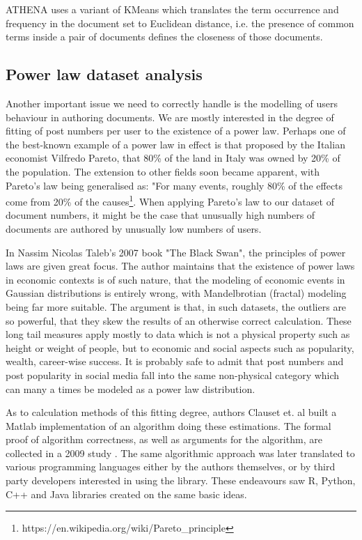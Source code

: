 ATHENA uses a variant of KMeans which translates the term occurrence and frequency in the document set to Euclidean distance, i.e. the presence of common terms inside a pair of documents defines the closeness of those documents.

\subsection{Power law dataset analysis}
Another important issue we need to correctly handle is the modelling of users behaviour in authoring documents. We are mostly interested in the degree of fitting of post numbers per user to the existence of a power law. Perhaps one of the best-known example of a power law in effect is that proposed by the Italian economist Vilfredo Pareto, that 80\% of the land in Italy was owned by 20\% of the population. The extension to other fields soon became apparent, with Pareto's law being generalised as: "For many events, roughly 80\% of the effects come from 20\% of the causes\footnote{https://en.wikipedia.org/wiki/Pareto\_principle}. When applying Pareto's law to our dataset of document numbers, it might be the case that unusually high numbers of documents are authored by unusually low numbers of users.

In Nassim Nicolas Taleb's 2007 book "The Black Swan"\cite{taleb2007black}, the principles of power laws are given great focus. The author maintains that the existence of power laws in economic contexts is of such nature, that the modeling of economic events in Gaussian distributions is entirely wrong, with Mandelbrotian (fractal) modeling being far more suitable. The argument is that, in such datasets, the outliers are so powerful, that they skew the results of an otherwise correct calculation. These long tail measures apply mostly to data which is not a physical property such as height or weight of people, but to economic and social aspects such as popularity, wealth, career-wise success. It is probably safe to admit that post numbers and post popularity in social media fall into the same non-physical category which can many a times be modeled as a power law distribution.

As to calculation methods of this fitting degree, authors Clauset et. al built a Matlab implementation of an algorithm doing these estimations. The formal proof of algorithm correctness, as well as arguments for the algorithm, are collected in a 2009 study \cite{clauset2009power}. The same algorithmic approach was later translated to various programming languages either by the authors themselves, or by third party developers interested in using the library. These endeavours saw R, Python, C++ and Java libraries created on the same basic ideas.

